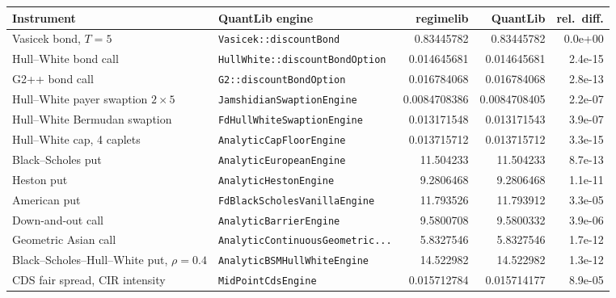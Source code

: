 \begin{tabular}{llrrr}\toprule
Instrument & QuantLib engine & regimelib & QuantLib & rel.\ diff.\\\midrule
Vasicek bond, $T=5$ & \texttt{Vasicek::discountBond} & 0.83445782 & 0.83445782 & 0.0e+00\\
Hull--White bond call & \texttt{HullWhite::discountBondOption} & 0.014645681 & 0.014645681 & 2.4e-15\\
G2++ bond call & \texttt{G2::discountBondOption} & 0.016784068 & 0.016784068 & 2.8e-13\\
Hull--White payer swaption $2\times5$ & \texttt{JamshidianSwaptionEngine} & 0.0084708386 & 0.0084708405 & 2.2e-07\\
Hull--White Bermudan swaption & \texttt{FdHullWhiteSwaptionEngine} & 0.013171548 & 0.013171543 & 3.9e-07\\
Hull--White cap, 4 caplets & \texttt{AnalyticCapFloorEngine} & 0.013715712 & 0.013715712 & 3.3e-15\\
Black--Scholes put & \texttt{AnalyticEuropeanEngine} & 11.504233 & 11.504233 & 8.7e-13\\
Heston put & \texttt{AnalyticHestonEngine} & 9.2806468 & 9.2806468 & 1.1e-11\\
American put & \texttt{FdBlackScholesVanillaEngine} & 11.793526 & 11.793912 & 3.3e-05\\
Down-and-out call & \texttt{AnalyticBarrierEngine} & 9.5800708 & 9.5800332 & 3.9e-06\\
Geometric Asian call & \texttt{AnalyticContinuousGeometric...} & 5.8327546 & 5.8327546 & 1.7e-12\\
Black--Scholes--Hull--White put, $\rho=0.4$ & \texttt{AnalyticBSMHullWhiteEngine} & 14.522982 & 14.522982 & 1.3e-12\\
CDS fair spread, CIR intensity & \texttt{MidPointCdsEngine} & 0.015712784 & 0.015714177 & 8.9e-05\\
\bottomrule\end{tabular}
